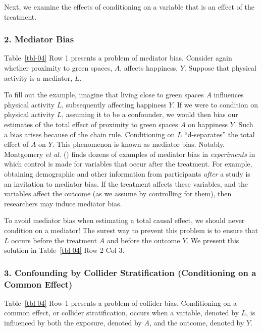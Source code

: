 \documentclass[
  singlecolumn]{article}
\begin{document}
Next, we examine the effects of conditioning on a variable that is an
effect of the treatment.

\subsubsection{2. Mediator Bias}\label{mediator-bias}

Table~\ref{tbl-04} Row 1 presents a problem of mediator bias. Consider
again whether proximity to green spaces, \(A\), affects happiness,
\(Y\). Suppose that physical activity is a mediator, \(L\).

To fill out the example, imagine that living close to green spaces \(A\)
influences physical activity \(L\), subsequently affecting happiness
\(Y\). If we were to condition on physical activity \(L\), assuming it
to be a confounder, we would then bias our estimates of the total effect
of proximity to green spaces \(A\) on happiness \(Y\). Such a bias
arises because of the chain rule. Conditioning on \(L\) ``d-separates''
the total effect of \(A\) on \(Y\). This phenomenon is known as mediator
bias. Notably, Montgomery \emph{et al.}
() finds dozens of examples of
mediator bias in \emph{experiments} in which control is made for
variables that occur after the treatment. For example, obtaining
demographic and other information from participants \emph{after} a study
is an invitation to mediator bias. If the treatment affects these
variables, and the variables affect the outcome (as we assume by
controlling for them), then researchers may induce mediator bias.

To avoid mediator bias when estimating a total causal effect, we should
never condition on a mediator! The surest way to prevent this problem is
to ensure that \(L\) occurs before the treatment \(A\) and before the
outcome \(Y\). We present this solution in Table~\ref{tbl-04} Row 2 Col
3.

\subsubsection{3. Confounding by Collider Stratification (Conditioning
on a Common
Effect)}\label{confounding-by-collider-stratification-conditioning-on-a-common-effect}

Table~\ref{tbl-04} Row 1 presents a problem of collider bias.
Conditioning on a common effect, or collider stratification, occurs when
a variable, denoted by \(L\), is influenced by both the exposure,
denoted by \(A\), and the outcome, denoted by \(Y\).
\end{document}
